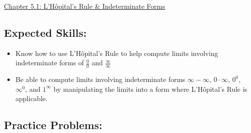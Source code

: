 \documentclass[12pt]{article}
\begin{document}
\begin{center}
\underline{\LARGE{Chapter 5.1: L'H\^{o}pital's Rule \& Indeterminate Forms}}
\end{center}

\subsection*{Expected Skills:}

\begin{itemize}

\item Know how to use L'H\^{o}pital's Rule to help compute limits involving indeterminate forms of $\frac{0}{0}$ and $\frac{\infty}{\infty}$

\item Be able to compute limits involving indeterminate forms $\infty-\infty$, $0 \cdot \infty$, $0^0$, $\infty^0$, and $1^{\infty}$ by manipulating the limits into a form where L'H\^{o}pital's Rule is applicable.

\end{itemize}

\subsection*{Practice Problems: }

\end{document}
